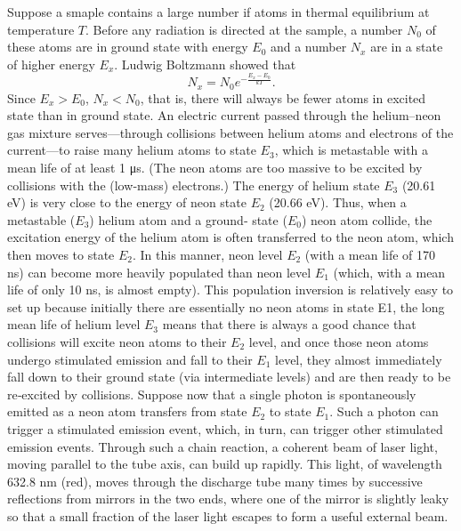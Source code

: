 \documentclass[a4paper,12pt]{report}
\begin{document}
\eit
{}
Suppose a smaple contains a large number if atoms in thermal equilibrium at temperature $T$. Before any radiation is directed at the sample, a number $N_0$ of these atoms are in ground state with energy $E_0$ and a number $N_x$ are in a state of higher energy $E_x$. Ludwig Boltzmann showed that
\[N_x=N_0e^{-\frac{E_x-E_0}{kT}}.\]
Since $E_x>E_0$, $N_x<N_0$, that is, there will always be fewer atoms in excited state than in ground state.
An electric current passed through the helium–neon gas mixture serves—through collisions between helium atoms and electrons of the current—to raise many helium atoms to state $E_3$, which is metastable with a mean life of at least 1 μs. (The neon atoms are too massive to be excited by collisions with the (low‑mass) electrons.) The energy of helium state $E_3$ (20.61 eV) is very close to the energy of neon state $E_2$ (20.66 eV). Thus, when a metastable ($E_3$) helium atom and a ground‑ state ($E_0$) neon atom collide, the excitation energy of the helium atom is often transferred to the neon atom, which then moves to state $E_2$. In this manner, neon level $E_2$ (with a mean life of 170 ns) can become more heavily populated than neon level $E_1$ (which, with a mean life of only 10 ns, is almost empty). This population inversion is relatively easy to set up because initially there are essentially no neon atoms in state E1, the long mean life of helium level $E_3$ means that there is always a good chance that collisions will excite neon atoms to their $E_2$ level, and once those neon atoms undergo stimulated emission and fall to their $E_1$ level, they almost immediately fall down to their ground state (via intermediate levels) and are then ready to be re‑excited by collisions. Suppose now that a single photon is spontaneously emitted as a neon atom transfers from state $E_2$ to state $E_1$. Such a photon can trigger a stimulated emission event, which, in turn, can trigger other stimulated emission events. Through such a chain reaction, a coherent beam of laser light, moving parallel to the tube axis, can build up rapidly. This light, of wavelength 632.8 nm (red), moves through the discharge tube many times by successive reflections from mirrors in the two ends, where one of the mirror is slightly leaky so that a small fraction of the laser light escapes to form a useful external beam.
\end{document}
